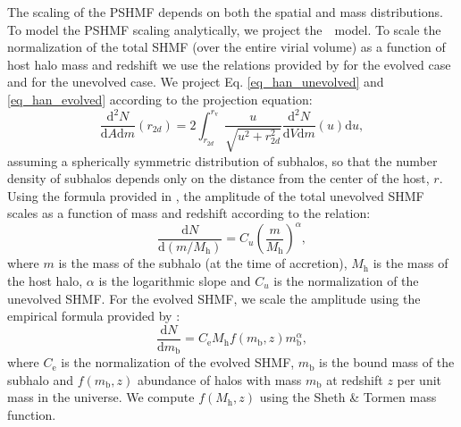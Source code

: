 \documentclass[%
 reprint,
 amsmath,
 amssymb,
 aps,
prd,
twocolumn,
superscriptaddress,
preprintnumbers,
floatfix,
nofootinbib
]{revtex4-2}
\def\hanetal{\citet{10.1093/mnras/stv2900}~}
\newcommand{\refeq}[1]{Eq. \ref{#1}}
\begin{document}
The scaling of the PSHMF depends on both the spatial and mass distributions.
To model the PSHMF scaling analytically, we project the~\hanetal model. 
To scale the normalization of the total SHMF (over the entire virial volume) as a function of host halo mass and redshift we use the relations provided by \citet{10.1111/j.1365-2966.2005.08964.x} for the evolved case and \citet{10.1111/j.1365-2966.2004.08360.x} for the unevolved case.
We project \refeq{eq_han_unevolved} and \ref{eq_han_evolved} according to the projection equation:
\begin{equation}
    \frac{\mathrm{d}^2N}{\mathrm{d}A \mathrm{d}m}(r_{2d}) = 2 \int_{r_{2d}}^{r_{\mathrm{v}}} \frac{u}{\sqrt{u^2 + r_{2d}^2}} \frac{\mathrm{d}^2 N}{\mathrm{d}V\mathrm{d}m}(u) \mathrm{d}u,
\end{equation}
assuming a spherically symmetric distribution of subhalos, so that the number density of subhalos depends only on the distance from the center of the host, $r$.
Using the formula provided in \citet{10.1111/j.1365-2966.2005.08964.x}, the amplitude of the total unevolved SHMF scales as a function of mass and redshift according to the relation:
\begin{equation}\label{eq_scaling_unevolved}
     \frac{\mathrm{d}N}{\mathrm{d}(m / M_{\mathrm{h}})} = C_u \left(\frac{m}{M_{\mathrm{h}}}\right)^{\alpha},
\end{equation}
where $m$ is the mass of the subhalo (at the time of accretion), $M_{\mathrm{h}}$ is the mass of the host halo, $ \alpha $ is the logarithmic slope and $ C_u $ is the normalization of the unevolved SHMF.
For the evolved SHMF, we scale the amplitude using the empirical formula provided by \citet{10.1111/j.1365-2966.2004.08360.x}:
\begin{equation}\label{eq_scaling_evolved}
    \frac{\mathrm{d}N}{\mathrm{d}m_{\mathrm{b}}} = C_\mathrm{e} M_{\mathrm{h}} f(m_{\mathrm{b}},z) m_{\mathrm{b}}^\alpha,
\end{equation}
where $C_\mathrm{e}$ is the normalization of the evolved SHMF, $m_{\mathrm{b}}$ is the bound mass of the subhalo and $f(m_{\mathrm{b}},z)$ abundance of halos with mass $m_{\mathrm{b}}$ at redshift $z$ per unit mass in the universe.
We compute $f(M_{\mathrm{h}}, z)$  using the Sheth \& Tormen \citep{sheth1999large} mass function.
\end{document}
